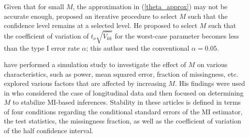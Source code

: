 \documentclass[11pt,a5paper,twoside]{book}
\begin{document}
Given that for small $M$, the approximation in (\ref{theta_approx}) may not be accurate enough, \cite{royston2004} proposed an iterative procedure to select $M$ such that the confidence level remains at a selected level. He proposed to select $M$ such that the coefficient of variation of $t_{\nu}\sqrt{\widehat{V_{kk}}}$ for the worst-case parameter becomes less than the type I error rate $\alpha$; this author used the conventional $\alpha=0.05$.


\cite{graham2007} have performed a simulation study to investigate the effect of $M$ on various characteristics, such as power, mean squared error, fraction of missingness, etc. \cite{bodner2008} explored various factors that are affected by increasing $M$. His findings were used in \cite{lu2014} who considered the case of longitudinal data and then focused on determining $M$ to stabilize MI-based inferences. Stability in these articles is defined in terms of four conditions regarding the conditional standard errors of the MI estimator, the test statistics, the missingness fraction, as well as the coefficient of variation of the half confidence interval. {\color{black}{Under some circumstances, these authors proposed to use as many as $200$ imputed datasets.}}

{} 
\end{document}
